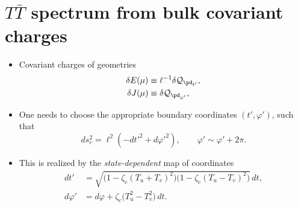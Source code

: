 \documentclass[10pt]{article}
\renewenvironment{frame}[1]%
	{\section*{#1}}%
	{\clearpage}
\newcommand{\pause}{}
\newenvironment{columns}%
	{\par\begin{minipage}{\textwidth}}%
	{\end{minipage}}
\newenvironment{column}[1]%
	{\begin{minipage}{#1}}%
	{\end{minipage}}
\newcommand{\TTbar}{\texorpdfstring{\ensuremath{T\bar{T}}}{TTbar}\xspace}
\begin{document}
\begin{frame}{\TTbar spectrum from bulk covariant charges}{%
	\textcite{Kraus:2021cwf,Apolo:2023vnm}
}
\begin{columns}
\begin{column}{\textwidth}
\vspace{-.3\baselineskip}
\begin{itemize}
\item Covariant charges of geometries
	\begin{align*}
		\delta E(\mu) &\equiv  \ell^{-1} \delta \mathcal Q_{\pd_{t'}}, \\ \delta J(\mu) &\equiv  \delta \mathcal Q_{\pd_{\varphi'}},
	\end{align*}

\item One needs to choose the appropriate boundary coordinates $(t',\varphi')$, such that
	\begin{equation}
		ds^2_c = \ell^2 ( -dt'^2 + d\varphi'^2) , \qquad \varphi' \sim \varphi' + 2\pi.\label{cutoffmetric}
	\end{equation}

\pause

\item This is realized by the \textit{state-dependent} map of coordinates
	\begin{align*}
		dt' &= \sqrt{ \big(1 - \zeta_c (T_u+T_v)^2 \big) \big(1 - \zeta_c (T_u-T_v)^2 \big) } \, dt,  \\
		 d\varphi' &= d\varphi + \zeta_c \big( T_u^2 - T_v^2 \big)\,dt.
	\end{align*}
\end{itemize}
\end{column}
\end{columns}
\end{frame}
\end{document}

